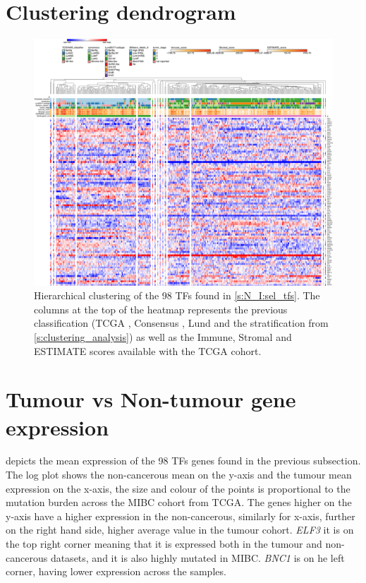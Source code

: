 \section{Clustering dendrogram} \label{s:ap:leiden_sbm}

\begin{figure}[!htb]   
\centering
\includegraphics[width=1.0\textwidth,keepaspectratio]{Sections/Network_I/Resources/selective_pruning/15_CS_norm_sel_tfs.png}
  \caption{Hierarchical clustering of the 98 TFs found in \cref{s:N_I:sel_tfs}. The columns at the top of the heatmap represents the previous classification (TCGA \cite{Robertson2017-mg}, Consensus \cite{Kamoun2020-tj}, Lund \cite{Marzouka2018-ge} and the stratification from \cref{s:clustering_analysis}) as well as the Immune, Stromal and ESTIMATE scores available with the TCGA cohort.}
\label{fig:ap:morph_sel_tfs}
\end{figure}

\section{Tumour vs Non-tumour gene expression} \label{s:ap:tum_vs_non-tumour}


 depicts the mean expression of the 98 TFs genes found in the previous subsection. The log plot shows the non-cancerous mean on the y-axis and the tumour mean expression on the x-axis, the size and colour of the points is proportional to the mutation burden across the MIBC cohort from TCGA. The genes higher on the y-axis have a higher expression in the non-cancerous, similarly for x-axis, further on the right hand side, higher average value in the tumour cohort. \textit{ELF3} it is on the top right corner meaning that it is expressed both in the tumour and non-cancerous datasets, and it is also highly mutated in MIBC. \textit{BNC1} is on he left corner, having lower expression across the samples.

